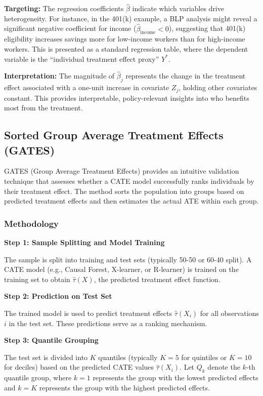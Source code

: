 \documentclass[12pt,a4paper]{article}
\begin{document}
\textbf{Targeting:} The regression coefficients $\hat{\beta}$ indicate which variables drive heterogeneity. For instance, in the 401(k) example, a BLP analysis might reveal a significant negative coefficient for income ($\hat{\beta}_{\text{income}} < 0$), suggesting that 401(k) eligibility increases savings more for low-income workers than for high-income workers. This is presented as a standard regression table, where the dependent variable is the ``individual treatment effect proxy'' $Y^*$.

\textbf{Interpretation:} The magnitude of $\hat{\beta}_j$ represents the change in the treatment effect associated with a one-unit increase in covariate $Z_j$, holding other covariates constant. This provides interpretable, policy-relevant insights into who benefits most from the treatment.

\subsection{Sorted Group Average Treatment Effects (GATES)}

GATES (Group Average Treatment Effects) provides an intuitive validation technique that assesses whether a CATE model successfully ranks individuals by their treatment effect. The method sorts the population into groups based on predicted treatment effects and then estimates the actual ATE within each group.

\subsubsection{Methodology}

\textbf{Step 1: Sample Splitting and Model Training}

The sample is split into training and test sets (typically 50-50 or 60-40 split). A CATE model (e.g., Causal Forest, X-learner, or R-learner) is trained on the training set to obtain $\hat{\tau}(X)$, the predicted treatment effect function.

\textbf{Step 2: Prediction on Test Set}

The trained model is used to predict treatment effects $\hat{\tau}(X_i)$ for all observations $i$ in the test set. These predictions serve as a ranking mechanism.

\textbf{Step 3: Quantile Grouping}

The test set is divided into $K$ quantiles (typically $K=5$ for quintiles or $K=10$ for deciles) based on the predicted CATE values $\hat{\tau}(X_i)$. Let $Q_k$ denote the $k$-th quantile group, where $k=1$ represents the group with the lowest predicted effects and $k=K$ represents the group with the highest predicted effects.
\end{document}
